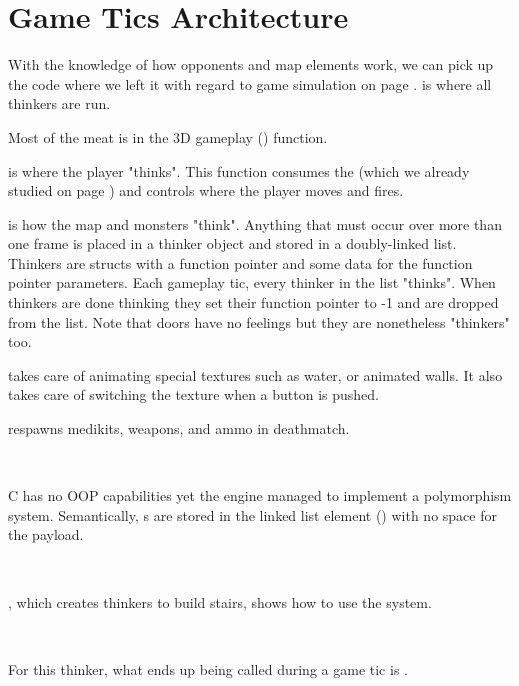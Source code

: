 \section{Game Tics Architecture}
With the knowledge of how opponents and map elements work, we can pick up the code where we left it with regard to game simulation on page \pageref{TryRunTics.c}.  is where all thinkers are run.\\
\par
{}
\par
Most of the meat is in the 3D gameplay () function.\\
\par
{}
\par
{} is where the player "thinks". This function consumes the  (which we already studied on page \pageref{cmd_t_type}) and controls where the player moves and fires.\\
\par 
{} is how the map and monsters "think". Anything that must occur over more than one frame is placed in a thinker object and stored in a doubly-linked list. Thinkers are structs with a function pointer and some data for the function pointer parameters. Each gameplay tic, every thinker in the list "thinks". When thinkers are done thinking they set their function pointer to -1 and are dropped from the list. Note that doors have no feelings but they are nonetheless "thinkers" too.\\
\par
{} takes care of animating special textures such as water, or animated walls. It also takes care of switching the texture when a button is pushed.\\
\par 

  respawns medikits, weapons, and ammo in deathmatch.



\\
\par
C has no OOP capabilities yet the engine managed to implement a polymorphism system. Semantically, s are stored in the linked list element () with no space for the payload. \\%
\par
{}\\
\par
{}, which creates thinkers to build stairs, shows how to use the system.\\
\par
{}\\
\par
For this thinker, what ends up being called during a game tic is .
